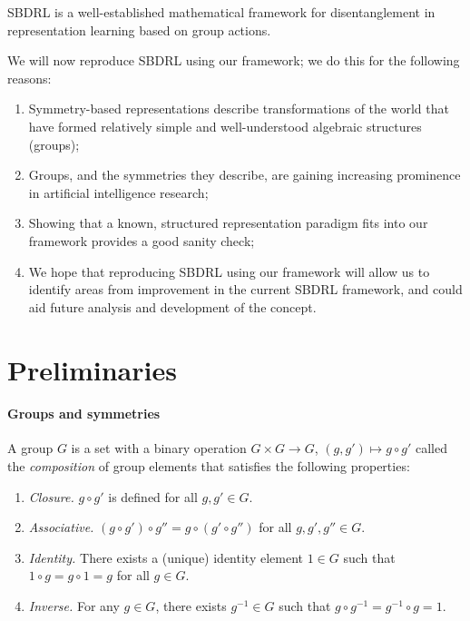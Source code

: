 SBDRL is a well-established mathematical framework for disentanglement in representation learning based on group actions.


We will now reproduce SBDRL using our framework; we do this for the following reasons:
\begin{enumerate}[(1)]
    \item Symmetry-based representations describe transformations of the world that have formed relatively simple and well-understood algebraic structures (groups);
    \item Groups, and the symmetries they describe, are gaining increasing prominence in artificial intelligence research;
    \item Showing that a known, structured representation paradigm fits into our framework provides a good sanity check;
    \item We hope that reproducing SBDRL using our framework will allow us to identify areas from improvement in the current SBDRL framework, and could aid future analysis and development of the concept.
\end{enumerate}


\section{Preliminaries}

\paragraph{Groups and symmetries}
\begin{definition}[Group]
	A group $G$ is a set with a binary operation $G \times G \to G$, $(g, g') \mapsto g \circ g'$ called the \textit{composition} of group elements that satisfies the following properties:
	\begin{enumerate}
		\item \textit{Closure.}
		      $g \circ g'$ is defined for all $g, g' \in G$.
		\item \textit{Associative.}
		      $(g \circ g') \circ g'' = g \circ (g' \circ g'')$ for all $g, g', g'' \in G$.
		\item \textit{Identity.}
		      There exists a (unique) identity element $1 \in G$ such that $1 \circ g = g \circ 1 = g$ for all $g \in G$.
		\item \textit{Inverse.}
		      For any $g \in G$, there exists $g^{-1} \in G$ such that $g \circ g^{-1} = g^{-1} \circ g = 1$.
	\end{enumerate}
\end{definition}

